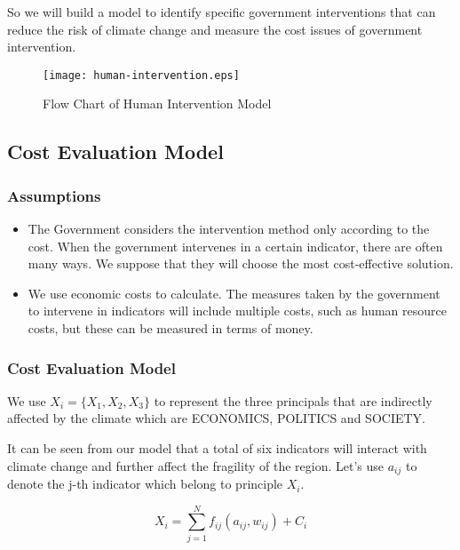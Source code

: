 \documentclass{mcmthesis}
\begin{document}
		So we will build a model to identify specific government interventions that can reduce the risk of climate change and measure the cost issues of government intervention.
		
		\begin{figure}[h]
			\small
			\centering
			\texttt{[image: human-intervention.eps]}
			\caption{Flow Chart of Human Intervention Model}
			\label{fig:human-intervention}
		\end{figure}
	
		\subsection{Cost Evaluation Model}
		
			\subsubsection{Assumptions}
	
				\begin{itemize}
					
					\item The Government considers the intervention method only according to the cost. When the government intervenes in a certain indicator, there are often many ways. We suppose that they will choose the most cost-effective solution.
					
					\item We use economic costs to calculate. The measures taken by the government to intervene in indicators will include multiple costs, such as human resource costs, but these can be measured in terms of money.
					
				\end{itemize}
			
			\subsubsection{Cost Evaluation Model}
			
			We use $X_i = \{ X_{1}, X_{2}, X_{3} \}$ to represent the three principals that are indirectly affected by the climate which are ECONOMICS, POLITICS and SOCIETY.
			
			It can be seen from our model that a total of six indicators will interact with climate change and further affect the fragility of the region. Let's use $a_{ij}$ to denote the j-th indicator which belong to principle $X_i$.

		
			\begin{equation}
				X _ { i } = \sum _ { j = 1 } ^{N} f _ { ij } ( a_{ij} , w_{ij} ) + C _ { i }
			\end{equation}
			
\end{document}
